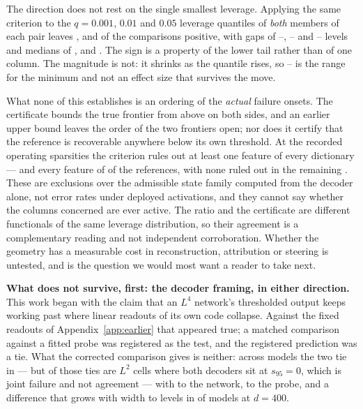 The direction does not rest on the single smallest leverage. Applying the same criterion to the
$q=0.001$, $0.01$ and $0.05$ leverage quantiles of \emph{both} members of each pair leaves
\SaeFailQaOneEarlier{}, \SaeFailQOneEarlier{} and \SaeFailQFiveEarlier{} of the \SaeDicts{}
comparisons positive, with gaps of \SaeFailQaOneGapMin{}--\SaeFailQaOneGapMax{},
\SaeFailQOneGapMin{}--\SaeFailQOneGapMax{} and \SaeFailQFiveGapMin{}--\SaeFailQFiveGapMax{} levels
and medians of \SaeFailQaOneGapMedian{}, \SaeFailQOneGapMedian{} and \SaeFailQFiveGapMedian{}. The
sign is a property of the lower tail rather than of one column. The magnitude is not: it shrinks as
the quantile rises, so \SaeFailGapMin{}--\SaeFailGapMax{} is the range for the minimum and not an
effect size that survives the move.

What none of this establishes is an ordering of the \emph{actual} failure onsets. The certificate
bounds the true frontier from above on both sides, and an earlier upper bound leaves the order of
the two frontiers open; nor does it certify that the reference is recoverable anywhere below its own
threshold. At the recorded operating sparsities the criterion rules out at least one feature of
every dictionary --- and every feature of \SaeFailCtlAllRuledOut{} of the \SaeFailRefs{} references,
with none ruled out in the remaining \SaeFailCtlNoneRuledOut{}. These are exclusions over the
admissible state family computed from the decoder alone, not error rates under deployed activations,
and they cannot say whether the columns concerned are ever active. The ratio and the certificate are
different functionals of the same leverage distribution, so their agreement is a complementary
reading and not independent corroboration. Whether the geometry has a measurable cost in
reconstruction, attribution or steering is untested, and is the question we would most want a reader
to take next.

\textbf{What does not survive, first: the decoder framing, in either direction.} This work began with
the claim that an $L^4$ network's thresholded output keeps working past where linear readouts of its
own code collapse. Against the fixed readouts of Appendix~\ref{app:earlier} that appeared true; a
matched comparison against a fitted probe was registered as the test, and the registered prediction
was a tie. What the corrected comparison gives is neither: across \PrimModels{} models the two tie in
\PrimTies{} --- but \PrimLtwoJointFailures{} of those ties are $L^2$ cells where both decoders sit at
$s_{95}=0$, which is joint failure and not agreement --- with \PrimNetWins{} to the network,
\PrimProbeWins{} to the probe, and a difference that grows with width to \ScPrimDiff{} levels in
\ScPrimNetWins{} of \ScSeeds{} models at $d=400$.

